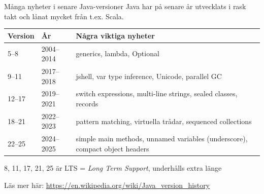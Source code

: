 \begin{Slide}{Många nyheter i senare Java-versioner}\SlideFontSmall
Java har på senare år utvecklats i rask takt och lånat mycket från t.ex. Scala.

\vspace{0.5em}\begin{tabular}{l l p{}}
Version & År & Några viktiga nyheter \\\hline
5--8 & 2004--2014 & generics, lambda, Optional\\ 
9--11  & 2017--2018 & jshell, var type inference, Unicode, parallel GC \\
12--17 & 2019--2021 & switch expressions, multi-line strings, sealed classes, records\\
18--21  & 2022--2023 & pattern matching, virtuella trådar, sequenced collections\\
22--25  & 2024--2025 & simple main methods, unnamed variables (underscore), compact object headers\\
\hline
\end{tabular}

\vspace{3em} 8, 11, 17, 21, 25 är LTS = \emph{Long Term Support}, underhålls extra länge

Läs mer här: \url{https://en.wikipedia.org/wiki/Java_version_history}
\end{Slide}








